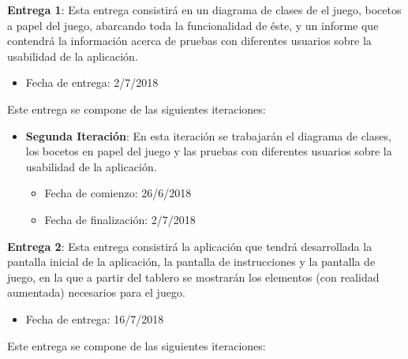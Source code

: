 \hfill

\textbf{Entrega 1}: Esta entrega consistirá en un diagrama de clases de el juego, bocetos a papel del juego, abarcando toda la funcionalidad de éste, y un informe que contendrá la información acerca de pruebas con diferentes usuarios sobre la usabilidad de la aplicación.

\begin{itemize}
  \item Fecha de entrega: 2/7/2018
\end{itemize}

\hfill

Este entrega se compone de las siguientes iteraciones:

\begin{itemize}
  \item \textbf{Segunda Iteración}: En esta iteración se trabajarán el diagrama de clases, los bocetos en papel del juego y las pruebas con diferentes usuarios sobre la usabilidad de la aplicación.

  \begin{itemize}
    \item Fecha de comienzo: 26/6/2018
    \item Fecha de finalización: 2/7/2018
  \end{itemize}
\end{itemize}

\hfill

\textbf{Entrega 2}: Esta entrega consistirá la aplicación que tendrá desarrollada la pantalla inicial de la aplicación, la pantalla de instrucciones y la pantalla de juego, en la que a partir del tablero se mostrarán los elementos (con realidad aumentada) necesarios para el juego.

\begin{itemize}
  \item Fecha de entrega: 16/7/2018
\end{itemize}

\hfill

Este entrega se compone de las siguientes iteraciones:

